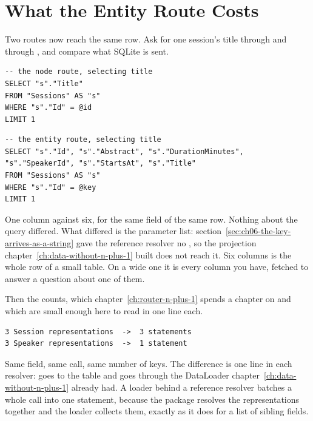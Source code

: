\section{What the Entity Route Costs}
\label{sec:ch06-what-the-entity-route-costs}

%
Two routes now reach the same row. Ask for one session's title through
 and through , and compare what SQLite is sent.

\begin{verbatim}
-- the node route, selecting title
SELECT "s"."Title"
FROM "Sessions" AS "s"
WHERE "s"."Id" = @id
LIMIT 1
\end{verbatim}

\begin{verbatim}
-- the entity route, selecting title
SELECT "s"."Id", "s"."Abstract", "s"."DurationMinutes", "s"."SpeakerId", "s"."StartsAt", "s"."Title"
FROM "Sessions" AS "s"
WHERE "s"."Id" = @key
LIMIT 1
\end{verbatim}

%
One column against six, for the same field of the same row. Nothing about the
query differed. What differed is the parameter list:
section~\ref{sec:ch06-the-key-arrives-as-a-string} gave the reference resolver
no , so the projection
chapter~\ref{ch:data-without-n-plus-1} built does not reach it. Six columns
is the whole row of a small table. On a wide one it is every column you have,
fetched to answer a question about one of them.

%
Then the counts, which chapter~\ref{ch:router-n-plus-1} spends a chapter on and
which are small enough here to read in one line each.

\begin{verbatim}
3 Session representations  ->  3 statements
3 Speaker representations  ->  1 statement
\end{verbatim}

%
Same field, same call, same number of keys. The difference is one line in each
resolver:  goes to the table and  goes
through the DataLoader chapter~\ref{ch:data-without-n-plus-1} already had. A
loader behind a reference resolver batches a whole call into one statement,
because the package resolves the representations together and the loader
collects them, exactly as it does for a list of sibling fields.

